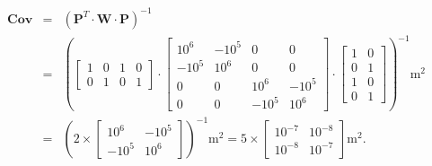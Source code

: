 \begin{eqnarray}
\mathbf{Cov}&=&(\mathbf{P}^T\cdot\mathbf{W}\cdot\mathbf{P})^{-1}\\
&=&\left(\left[\begin{array}{cccc}1&0&1&0\\0&1&0&1\end{array}\right]\cdot\left[\begin{array}{cccc}10^6&-10^5&0&0\\-10^5&10^6&0&0\\0&0&10^6&-10^5\\0&0&-10^5&10^6\end{array}\right]\cdot\left[\begin{array}{cc}1&0\\0&1\\1&0\\0&1\end{array}\right]\right)^{-1}\text{m}^2\\
&=&\left(2\times\left[\begin{array}{cc}10^6&-10^5\\-10^5&10^6\end{array}\right]\right)^{-1}\text{m}^2=5\times\left[\begin{array}{cc}10^{-7}&10^{-8}\\10^{-8}&10^{-7}\end{array}\right]\text{m}^2.
\end{eqnarray}

